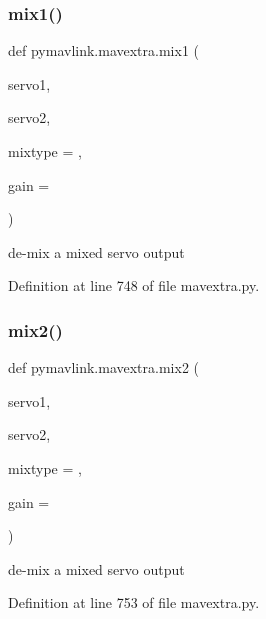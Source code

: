 \mbox{\label{namespacepymavlink_1_1mavextra_ae2ac3b544989ec220c6ef351e7ef5204}} 
\subsubsection{\texorpdfstring{mix1()}{mix1()}}
{\footnotesize\ttfamily def pymavlink.\+mavextra.\+mix1 (\begin{DoxyParamCaption}\item[{}]{servo1,  }\item[{}]{servo2,  }\item[{}]{mixtype = {},  }\item[{}]{gain = {} }\end{DoxyParamCaption})}

\begin{DoxyVerb}de-mix a mixed servo output\end{DoxyVerb}
 

Definition at line 748 of file mavextra.\+py.

\mbox{\label{namespacepymavlink_1_1mavextra_a9917a9cc993bdb7a607478dbb089111d}} 
\subsubsection{\texorpdfstring{mix2()}{mix2()}}
{\footnotesize\ttfamily def pymavlink.\+mavextra.\+mix2 (\begin{DoxyParamCaption}\item[{}]{servo1,  }\item[{}]{servo2,  }\item[{}]{mixtype = {},  }\item[{}]{gain = {} }\end{DoxyParamCaption})}

\begin{DoxyVerb}de-mix a mixed servo output\end{DoxyVerb}
 

Definition at line 753 of file mavextra.\+py.

\mbox{\label{namespacepymavlink_1_1mavextra_ae33f40df072016fd86d881d715a57f91}} 
